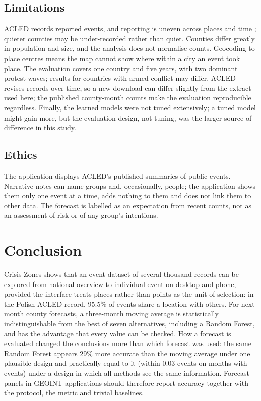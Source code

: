 \documentclass[11pt,a4paper]{article}
\newcommand{\appname}{Crisis Zones}
\begin{document}
\subsection{Limitations}

ACLED records reported events, and reporting is uneven across places and time \cite{weidmann2016,raleigh2023}; quieter counties may be under-recorded rather than quiet. Counties differ greatly in population and size, and the analysis does not normalise counts. Geocoding to place centres means the map cannot show where within a city an event took place. The evaluation covers one country and five years, with two dominant protest waves; results for countries with armed conflict may differ. ACLED revises records over time, so a new download can differ slightly from the extract used here; the published county-month counts make the evaluation reproducible regardless. Finally, the learned models were not tuned extensively; a tuned model might gain more, but the evaluation design, not tuning, was the larger source of difference in this study.

\subsection{Ethics}

The application displays ACLED's published summaries of public events. Narrative notes can name groups and, occasionally, people; the application shows them only one event at a time, adds nothing to them and does not link them to other data. The forecast is labelled as an expectation from recent counts, not as an assessment of risk or of any group's intentions.

\section{Conclusion}
\label{sec:conclusion}

\appname{} shows that an event dataset of several thousand records can be explored from national overview to individual event on desktop and phone, provided the interface treats places rather than points as the unit of selection: in the Polish ACLED record, 95.5\% of events share a location with others. For next-month county forecasts, a three-month moving average is statistically indistinguishable from the best of seven alternatives, including a Random Forest, and has the advantage that every value can be checked. How a forecast is evaluated changed the conclusions more than which forecast was used: the same Random Forest appears 29\% more accurate than the moving average under one plausible design and practically equal to it (within 0.03 events on months with events) under a design in which all methods see the same information. Forecast panels in GEOINT applications should therefore report accuracy together with the protocol, the metric and trivial baselines.
\end{document}
